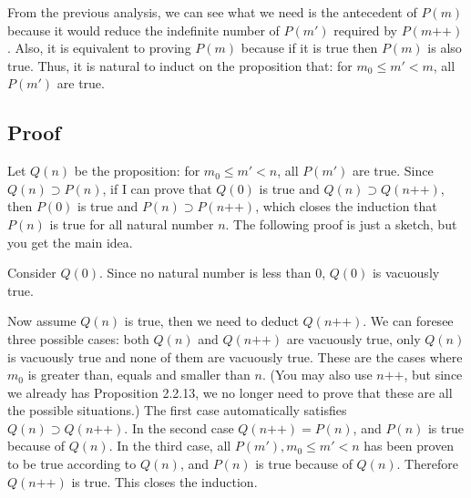 \documentclass{article}
\def\normalparagraph[#1]{
\subsection*{#1}
\addcontentsline{toc}{subsection}{#1}
}
\begin{document}
From the previous analysis, we can see what we need is the antecedent of \(P(m)\) because it would reduce the indefinite number of $P(m')$ required by $P(m \texttt{++})$. Also, it is equivalent to proving \(P(m)\) because if it is true then \(P(m)\) is also true. Thus, it is natural to induct on the proposition that: for \(m_{0} \le m' < m\),  all \(P(m')\) are true.

\normalparagraph[Proof]{}
Let \(Q(n)\) be the proposition:  for \(m_{0} \le m' < n\),  all \(P(m')\) are true. Since \(Q(n) \supset P(n)\), if I can prove that \(Q(0)\) is true and \(Q(n) \supset Q(n \texttt{++})\), then \(P(0)\) is true and \(P(n) \supset P(n \texttt{++})\), which closes the induction that \(P(n)\) is true for all natural number \(n\). The following proof is just a sketch, but you get the main idea.

Consider \(Q(0)\). Since no natural number is less than 0, \(Q(0)\) is vacuously true.

Now assume \(Q(n)\) is true, then we need to deduct \(Q(n \texttt{++})\). We can foresee three possible cases: both \(Q(n)\) and \(Q(n \texttt{++})\) are vacuously true, only \(Q(n)\) is vacuously true and none of them are vacuously true. These are the cases where \(m_{0}\) is greater than, equals and smaller than \(n\). (You may also use \(n \texttt{++}\), but since we already has Proposition 2.2.13, we no longer need to prove that these are all the possible situations.) The first case automatically satisfies \(Q(n) \supset Q(n \texttt{++})\). In the second case \(Q(n \texttt{++}) = P(n)\), and \(P(n)\) is true because of \(Q(n)\). In the third case, all \(P(m'), m_{0} \le m' < n\) has been proven to be true according to \(Q(n)\), and \(P(n)\) is true because of \(Q(n)\). Therefore \(Q(n \texttt{++})\) is true. This closes the induction.
\end{document}
